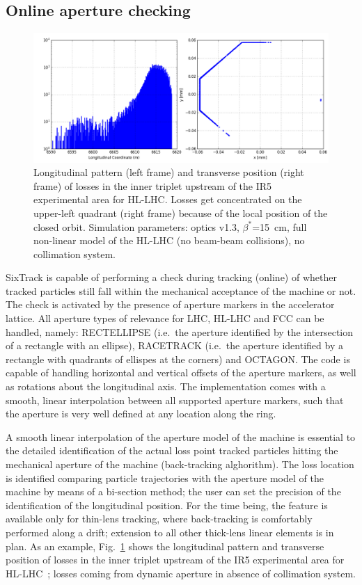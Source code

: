 \documentclass[a4paper,
              ]{jacow}
\begin{document}
\subsection{Online aperture checking}
\begin{figure}[!tbh]
\centering
 \includegraphics[width=\textwidth]{losses_IR5_mod.png}
 \caption{Longitudinal pattern (left frame) and transverse position (right frame) of losses in the inner triplet upstream of the IR5 experimental area for HL-LHC. Losses get concentrated on the upper-left quadrant (right frame) because of the local position of the closed orbit. Simulation parameters: optics v1.3, $\beta^*$=15~cm, full non-linear model of the HL-LHC (no beam-beam collisions), no collimation system.}
 \label{fig:LM_IR5}
\end{figure}

SixTrack is capable of performing a check during tracking (online) of whether tracked particles still fall within the mechanical acceptance of the machine or not. The check is activated by the presence of aperture markers in the accelerator lattice. All aperture types of relevance for LHC, HL-LHC and FCC can be handled, namely: RECTELLIPSE (i.e.~the aperture identified by the intersection of a rectangle with an ellipse), RACETRACK (i.e.~the aperture identified by a rectangle with quadrants of ellispes at the corners) and OCTAGON. The code is capable of handling horizontal and vertical offsets of the aperture markers, as well as rotations about the longitudinal axis. The implementation comes with a smooth, linear interpolation between all supported aperture markers, such that the aperture is very well defined at any location along the ring.

A smooth linear interpolation of the aperture model of the machine is essential to the detailed identification of the actual loss point tracked particles hitting the mechanical aperture of the machine (back-tracking alghorithm). The loss location is identified comparing particle trajectories with the aperture model of the machine by means of a bi-section method; the user can set the precision of the identification of the longitudinal position. For the time being, the feature is available only for thin-lens tracking, where back-tracking is comfortably performed along a drift; extension to all other thick-lens linear elements is in plan. As an example, Fig.~\ref{fig:LM_IR5} shows the longitudinal pattern and transverse position of losses in the inner triplet upstream of the IR5 experimental area for HL-LHC~\cite{HL-TDR}; losses coming from dynamic aperture in absence of collimation system.
\end{document}
